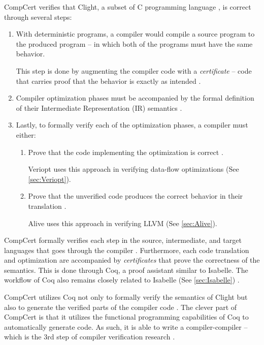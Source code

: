 CompCert verifies that Clight, a subset of C programming language \cite{compcertVerification}, is correct through several steps:
\begin{enumerate}
    \item 
    With deterministic programs, a compiler would compile a source program to the produced program -- in which both of the programs must have 
    the same behavior.
    
    This step is done by augmenting the compiler code with a \emph{certificate} -- code that carries proof that the behavior is exactly as intended 
    \cite[Sec. 2.2]{compcertVerification}.

    \item Compiler optimization phases must be accompanied by the formal definition of their Intermediate Representation (IR) semantics 
          \cite{compcertVerification,ATVA21_GraalVM_IR_Semantics}.
    
    \item Lastly, to formally verify each of the optimization phases, a compiler must either:
    \begin{enumerate}
        \item
        Prove that the code implementing the optimization is correct \cite[Sec. 2.4]{compcertVerification}.
        
        Veriopt uses this approach in verifying data-flow optimizations (See \ref{sec:Veriopt}).

        \item 
        Prove that the unverified code produces the correct behavior in their translation \cite[Sec. 2.4]{compcertVerification}.

        Alive uses this approach in verifying LLVM (See \ref{sec:Alive}).
    \end{enumerate}
\end{enumerate}

CompCert formally verifies each step in the source, intermediate, and target languages that goes through the compiler 
\cite[Sec. 3.3]{compcertVerification}. Furthermore, each code translation and optimization are accompanied by \emph{certificates} that prove 
the correctness of the semantics. This is done through Coq, a proof assistant similar to Isabelle. The workflow of Coq also remains closely related to 
Isabelle (See \ref{sec:Isabelle}) \cite[Sec. 3.3]{compcertVerification}. 

CompCert utilizes Coq not only to formally verify the semantics of Clight but also to generate the verified parts of the compiler code 
\cite[Sec. 3.4]{compcertVerification}. The clever part of CompCert is that it utilizes the functional programming capabilities of Coq 
to automatically generate code. As such, it is able to write a compiler-compiler -- which is the 3rd step of compiler verification research 
\cite{CompilerOptimization}.

